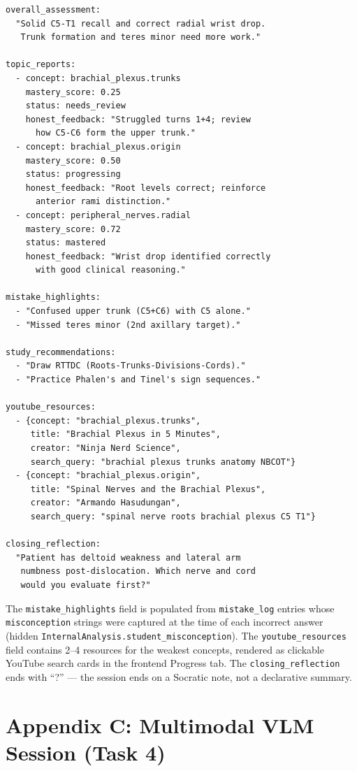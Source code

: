\documentclass[11pt]{article}
\begin{document}
\begin{lstlisting}
overall_assessment:
  "Solid C5-T1 recall and correct radial wrist drop.
   Trunk formation and teres minor need more work."

topic_reports:
  - concept: brachial_plexus.trunks
    mastery_score: 0.25
    status: needs_review
    honest_feedback: "Struggled turns 1+4; review
      how C5-C6 form the upper trunk."
  - concept: brachial_plexus.origin
    mastery_score: 0.50
    status: progressing
    honest_feedback: "Root levels correct; reinforce
      anterior rami distinction."
  - concept: peripheral_nerves.radial
    mastery_score: 0.72
    status: mastered
    honest_feedback: "Wrist drop identified correctly
      with good clinical reasoning."

mistake_highlights:
  - "Confused upper trunk (C5+C6) with C5 alone."
  - "Missed teres minor (2nd axillary target)."

study_recommendations:
  - "Draw RTTDC (Roots-Trunks-Divisions-Cords)."
  - "Practice Phalen's and Tinel's sign sequences."

youtube_resources:
  - {concept: "brachial_plexus.trunks",
     title: "Brachial Plexus in 5 Minutes",
     creator: "Ninja Nerd Science",
     search_query: "brachial plexus trunks anatomy NBCOT"}
  - {concept: "brachial_plexus.origin",
     title: "Spinal Nerves and the Brachial Plexus",
     creator: "Armando Hasudungan",
     search_query: "spinal nerve roots brachial plexus C5 T1"}

closing_reflection:
  "Patient has deltoid weakness and lateral arm
   numbness post-dislocation. Which nerve and cord
   would you evaluate first?"
\end{lstlisting}

\noindent The \texttt{mistake\_highlights} field is populated from
\texttt{mistake\_log} entries whose \texttt{misconception} strings were
captured at the time of each incorrect answer (hidden
\texttt{InternalAnalysis.student\_misconception}).
The \texttt{youtube\_resources} field contains 2--4 resources for the weakest
concepts, rendered as clickable YouTube search cards in the frontend Progress tab.
The \texttt{closing\_reflection} ends with ``?'' --- the session ends on a
Socratic note, not a declarative summary.

\section*{Appendix C: Multimodal VLM Session (Task 4)}
\label{app:vlm}
\end{document}

